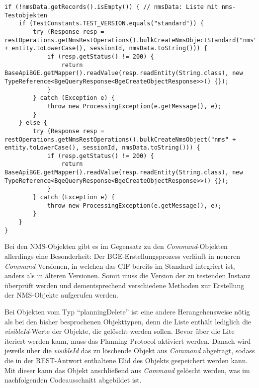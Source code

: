\begin{lstlisting}[caption=Erstellen von \textit{NMS}-Objekten über die BGE, label=createNMSTestObjects,style=Javastyle]
if (!nmsData.getRecords().isEmpty()) { // nmsData: Liste mit nms-Testobjekten
    if (TestConstants.TEST_VERSION.equals("standard")) {
        try (Response resp = restOperations.getNmsRestOperations().bulkCreateNmsObjectStandard("nms" + entity.toLowerCase(), sessionId, nmsData.toString())) {
            if (resp.getStatus() != 200) {
                return BaseApiBGE.getMapper().readValue(resp.readEntity(String.class), new TypeReference<BgeQueryResponse<BgeCreateObjectResponse>>() {});
            }
        } catch (Exception e) {
            throw new ProcessingException(e.getMessage(), e);
        }
    } else {
        try (Response resp = restOperations.getNmsRestOperations().bulkCreateNmsObject("nms" + entity.toLowerCase(), sessionId, nmsData.toString())) {
            if (resp.getStatus() != 200) {
                return BaseApiBGE.getMapper().readValue(resp.readEntity(String.class), new TypeReference<BgeQueryResponse<BgeCreateObjectResponse>>() {});
            }
        } catch (Exception e) {
            throw new ProcessingException(e.getMessage(), e);
        }
    }
}
\end{lstlisting}

Bei den \ac{NMS}-Objekten gibt es im Gegensatz zu den \textit{Command}-Objekten allerdings eine Besonderheit: Der \ac{BGE}-Erstellungsprozess verläuft in neueren \textit{Command}-Versionen, in welchen das \ac{CIF} bereits im Standard integriert ist, anders als in älteren Versionen. Somit muss die Version der zu testenden Instanz überprüft werden und dementsprechend verschiedene Methoden zur Erstellung der \ac{NMS}-Objekte aufgerufen werden.

Bei Objekten vom Typ \enquote{planningDelete} ist eine andere Herangehensweise nötig als bei den bisher besprochenen Objekttypen, denn die Liste enthält lediglich die \textit{visibleId}-Werte der Objekte, die gelöscht werden sollen. Bevor über die Lite iteriert werden kann, muss das Planning Protocol aktiviert werden. Danach wird jeweils über die \textit{visibleId} das zu löschende Objekt aus \textit{Command} abgefragt, sodass die in der \ac{REST}-Antwort enthaltene \ac{Elid} des Objekts gespeichert werden kann. Mit dieser kann das Objekt anschließend aus \textit{Command} gelöscht werden, was im nachfolgenden Codeausschnitt abgebildet ist.

